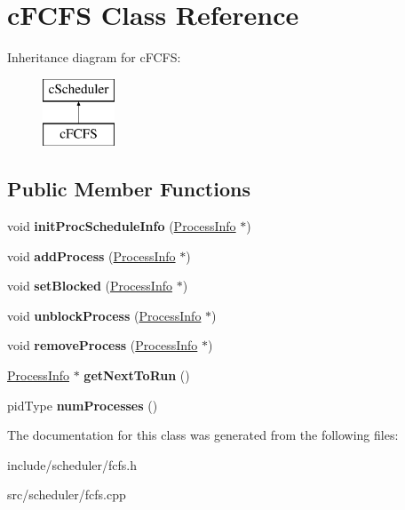 \hypertarget{classcFCFS}{\section{c\-F\-C\-F\-S \-Class \-Reference}
\label{d6/dc3/classcFCFS}
}
\-Inheritance diagram for c\-F\-C\-F\-S\-:\begin{figure}[H]
\begin{center}
\leavevmode
\includegraphics[height=2.000000cm]{d6/dc3/classcFCFS}
\end{center}
\end{figure}
\subsection*{\-Public \-Member \-Functions}
\begin{DoxyCompactItemize}
\item 
\hypertarget{classcFCFS_aff34f18c6f4c3f38029d904cd2ec55de}{void {\bfseries init\-Proc\-Schedule\-Info} (\hyperlink{structProcessInfo}{\-Process\-Info} $\ast$)}\label{d6/dc3/classcFCFS_aff34f18c6f4c3f38029d904cd2ec55de}

\item 
\hypertarget{classcFCFS_a25d4bf440041f5294f3b9c5aff20b411}{void {\bfseries add\-Process} (\hyperlink{structProcessInfo}{\-Process\-Info} $\ast$)}\label{d6/dc3/classcFCFS_a25d4bf440041f5294f3b9c5aff20b411}

\item 
\hypertarget{classcFCFS_a1b8ee3a759a31032ec7c1cd7b15ed5df}{void {\bfseries set\-Blocked} (\hyperlink{structProcessInfo}{\-Process\-Info} $\ast$)}\label{d6/dc3/classcFCFS_a1b8ee3a759a31032ec7c1cd7b15ed5df}

\item 
\hypertarget{classcFCFS_a793da0298f9b36ab8505a0e3daaf41ec}{void {\bfseries unblock\-Process} (\hyperlink{structProcessInfo}{\-Process\-Info} $\ast$)}\label{d6/dc3/classcFCFS_a793da0298f9b36ab8505a0e3daaf41ec}

\item 
\hypertarget{classcFCFS_aeeac757885108ae510b728600ebba248}{void {\bfseries remove\-Process} (\hyperlink{structProcessInfo}{\-Process\-Info} $\ast$)}\label{d6/dc3/classcFCFS_aeeac757885108ae510b728600ebba248}

\item 
\hypertarget{classcFCFS_aa2b92a8a992078e499aab455c9d78faf}{\hyperlink{structProcessInfo}{\-Process\-Info} $\ast$ {\bfseries get\-Next\-To\-Run} ()}\label{d6/dc3/classcFCFS_aa2b92a8a992078e499aab455c9d78faf}

\item 
\hypertarget{classcFCFS_a0a72de791436a84120a534dd2fa0485d}{pid\-Type {\bfseries num\-Processes} ()}\label{d6/dc3/classcFCFS_a0a72de791436a84120a534dd2fa0485d}

\end{DoxyCompactItemize}


\-The documentation for this class was generated from the following files\-:\begin{DoxyCompactItemize}
\item 
include/scheduler/fcfs.\-h\item 
src/scheduler/fcfs.\-cpp\end{DoxyCompactItemize}
